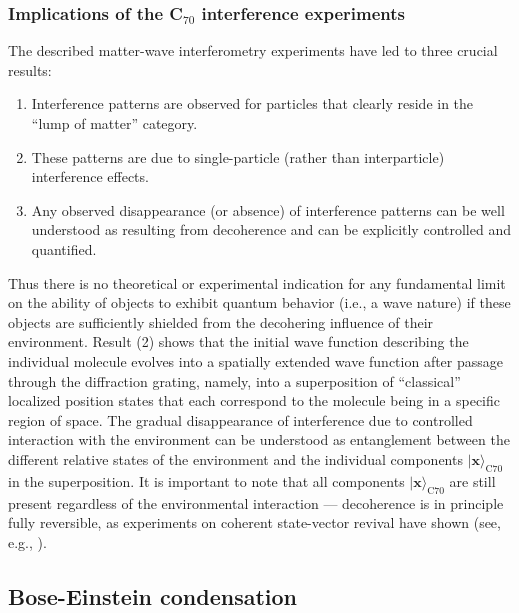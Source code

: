 \documentclass[twocolumn,aps,floatfix,amsmath,amssymb,showpacs,nofootinbib]{revtex4}
\newcommand{\bn}{\begin{enumerate}} \newcommand{\en}{\end{enumerate}}
\newcommand{\ket}[1]{\ensuremath{|{#1\rangle}}}
\begin{document}
\subsubsection{Implications of the C$_{70}$ interference experiments}

The described matter-wave interferometry experiments have led to three
crucial results:

\bn

\item Interference patterns are observed for particles that clearly
  reside in the ``lump of matter'' category.
  
\item These patterns are due to single-particle (rather than
  interparticle) interference effects.
  
\item Any observed disappearance (or absence) of interference patterns
  can be well understood as resulting from decoherence and can be
  explicitly controlled and quantified.

\en

Thus there is no theoretical or experimental indication for any
fundamental limit on the ability of objects to exhibit quantum
behavior (i.e., a wave nature) if these objects are sufficiently
shielded from the decohering influence of their environment. Result
(2) shows that the initial wave function describing the individual
molecule evolves into a spatially extended wave function after passage
through the diffraction grating, namely, into a superposition of
``classical'' localized position states that each correspond to the
molecule being in a specific region of space. The gradual
disappearance of interference due to controlled interaction with the
environment can be understood as entanglement between the different
relative states of the environment and the individual components
$\ket{\mathbf{x}}_{\text{C}70}$ in the superposition. It is important
to note that all components $\ket{\mathbf{x}}_{\text{C}70}$ are still
present regardless of the environmental interaction --- decoherence is
in principle fully reversible, as experiments on coherent state-vector
revival have shown (see, e.g., \cite{Raimond:1997:um}).


\subsection{Bose-Einstein condensation} \label{sec:bose}
\end{document}
